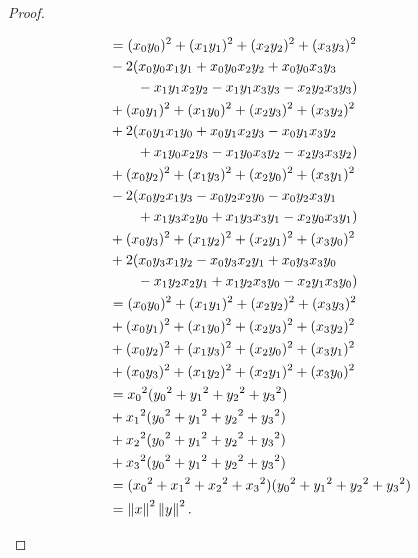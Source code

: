 \begin{proof}
\begin{itemize}
\begin{align*}
			&= (x_0y_0)^2 + (x_1y_1)^2 + (x_2y_2)^2 + (x_3y_3)^2 \\
			&- 2 (x_0y_0x_1y_1 + x_0y_0x_2y_2 + x_0y_0x_3y_3 \\
			&\qquad- x_1y_1x_2y_2 - x_1y_1x_3y_3 - x_2y_2x_3y_3) \\
			&+ (x_0y_1)^2 + (x_1y_0)^2 + (x_2y_3)^2 + (x_3y_2)^2 \\
			&+ 2 (x_0y_1x_1y_0 + x_0y_1x_2y_3 - x_0y_1x_3y_2 \\
			&\qquad+ x_1y_0x_2y_3 - x_1y_0x_3y_2 - x_2y_3x_3y_2) \\
			&+ (x_0y_2)^2 + (x_1y_3)^2 + (x_2y_0)^2 + (x_3y_1)^2 \\
			&- 2 (x_0y_2x_1y_3 - x_0y_2x_2y_0 - x_0y_2x_3y_1 \\
			&\qquad+ x_1y_3x_2y_0 + x_1y_3x_3y_1 - x_2y_0x_3y_1) \\
			&+ (x_0y_3)^2 + (x_1y_2)^2 + (x_2y_1)^2 + (x_3y_0)^2 \\
			&+ 2 (x_0y_3x_1y_2 - x_0y_3x_2y_1 + x_0y_3x_3y_0 \\
			&\qquad- x_1y_2x_2y_1 + x_1y_2x_3y_0 - x_2y_1x_3y_0) \\
			&= (x_0y_0)^2 + (x_1y_1)^2 + (x_2y_2)^2 + (x_3y_3)^2 \\
			&+ (x_0y_1)^2 + (x_1y_0)^2 + (x_2y_3)^2 + (x_3y_2)^2 \\
			&+ (x_0y_2)^2 + (x_1y_3)^2 + (x_2y_0)^2 + (x_3y_1)^2 \\
			&+ (x_0y_3)^2 + (x_1y_2)^2 + (x_2y_1)^2 + (x_3y_0)^2 \\
			&= {x_0}^2({y_0}^2+{y_1}^2+{y_2}^2+{y_3}^2) \\
			&+ {x_1}^2({y_0}^2+{y_1}^2+{y_2}^2+{y_3}^2) \\
			&+ {x_2}^2({y_0}^2+{y_1}^2+{y_2}^2+{y_3}^2) \\
			&+ {x_3}^2({y_0}^2+{y_1}^2+{y_2}^2+{y_3}^2) \\
			&= ({x_0}^2+{x_1}^2+{x_2}^2+{x_3}^2)({y_0}^2+{y_1}^2+{y_2}^2+{y_3}^2) \\
			&= \left\Vert{x}\right\Vert^2\left\Vert{y}\right\Vert^2.
		\end{align*}


\end{itemize}
\end{proof}
